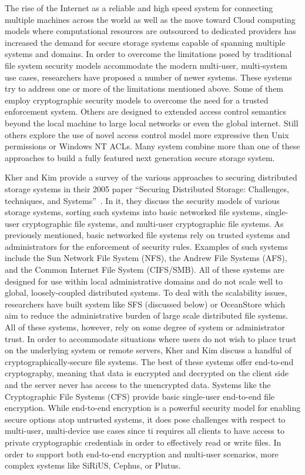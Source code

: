 \documentclass{sig-alternate}
\begin{document}
The rise of the Internet as a reliable and high speed system for
connecting multiple machines across the world as well as the move
toward Cloud computing models where computational resources are
outsourced to dedicated providers has increased the demand for secure
storage systems capable of spanning multiple systems and domains. In
order to overcome the limitations posed by traditional file system
security models accommodate the modern multi-user, multi-system use
cases, researchers have proposed a number of newer systems. These
systems try to address one or more of the limitations mentioned
above. Some of them employ cryptographic security models to overcome
the need for a trusted enforcement system. Others are designed to
extended access control semantics beyond the local machine to large
local networks or even the global internet. Still others explore the
use of novel access control model more expressive then Unix
permissions or Windows NT ACLs. Many system combine more than one of
these approaches to build a fully featured next generation secure
storage system.

Kher and Kim provide a survey of the various approaches to securing
distributed storage systems in their 2005 paper ``Securing Distributed
Storage: Challenges, techniques, and Systems''~\cite{Kher2005}. In it,
they discuss the security models of various storage systems, sorting
such systems into basic networked file systems, single-user
cryptographic file systems, and multi-user cryptographic file
systems. As previously mentioned, basic networked file systems rely on
trusted systems and administrators for the enforcement of security
rules. Examples of such systems include the Sun Network File System
(NFS), the Andrew File Systems (AFS), and the Common Internet File
System (CIFS/SMB). All of these systems are designed for use within
local administrative domains and do not scale well to global,
loosely-coupled distributed systems. To deal with the scalability
issues, researchers have built system like SFS (discussed below) or
OceanStore which aim to reduce the administrative burden of large
scale distributed file systems. All of these systems, however, rely on
some degree of system or administrator trust. In order to accommodate
situations where users do not wish to place trust on the underlying
system or remote servers, Kher and Kim discuss a handful of
cryptographically-secure file systems. The best of these systems offer
end-to-end cryptography, meaning that data is encrypted and decrypted
on the client side and the server never has access to the unencrypted
data.  Systems like the Cryptographic File Systems (CFS) provide basic
single-user end-to-end file encryption. While end-to-end encryption is
a powerful security model for enabling secure options atop untrusted
systems, it does pose challenges with respect to multi-user,
multi-device use cases since ti requires all clients to have access to
private cryptographic credentials in order to effectively read or
write files. In order to support both end-to-end encryption and
multi-user scenarios, more complex systems like SiRiUS, Cephus, or
Plutus.
\end{document}
